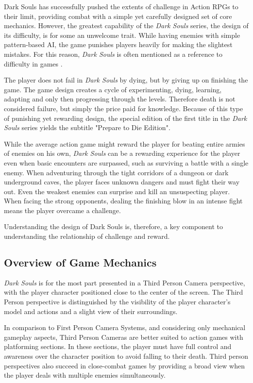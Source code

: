 \documentclass[cic,tc,english]{iiufrgs}
\begin{document}
Dark Souls has successfully pushed the extents of challenge in Action RPGs to their limit, providing combat with a simple yet carefully designed set of core mechanics. However, the greatest capability of the \emph{Dark Souls} series, the design of its difficulty, is for some an unwelcome trait. While having enemies with simple pattern-based AI, the game punishes players heavily for making the slightest mistakes. For this reason, \emph{Dark Souls} is often mentioned as a reference to difficulty in games \cite{URL_ExploringDesignOfDarkSouls}.

The player does not fail in \emph{Dark Souls} by dying, but by giving up on finishing the game. The game design creates a cycle of experimenting, dying, learning, adapting and only then progressing through the levels. Therefore death is not considered failure, but simply the price paid for knowledge. Because of this type of punishing yet rewarding design, the special edition of the first title in the \emph{Dark Souls} series yields the subtitle "Prepare to Die Edition".

While the average action game might reward the player for beating entire armies of enemies on his own, \emph{Dark Souls} can be a rewarding experience for the player even when basic encounters are surpassed, such as surviving a battle with a single enemy. When adventuring through the tight corridors of a dungeon or dark underground caves, the player faces unknown dangers and must fight their way out. Even the weakest enemies can surprise and kill an unsuspecting player. When facing the strong opponents, dealing the finishing blow in an intense fight means the player overcame a challenge.

Understanding the design of Dark Souls is, therefore, a key component to understanding the relationship of challenge and reward.

\subsection{Overview of Game Mechanics}

\emph{Dark Souls} is for the most part presented in a Third Person Camera perspective, with the player character positioned close to the center of the screen. The Third Person perspective is distinguished by the visibility of the player character's model and actions and a slight view of their surroundings.

In comparison to First Person Camera Systems, and considering only mechanical gameplay aspects, Third Person Cameras are better suited to action games with platforming sections. In these sections, the player must have full control and awareness over the character position to avoid falling to their death. Third person perspectives also succeed in close-combat games by providing a broad view when the player deals with multiple enemies simultaneously.
\end{document}
